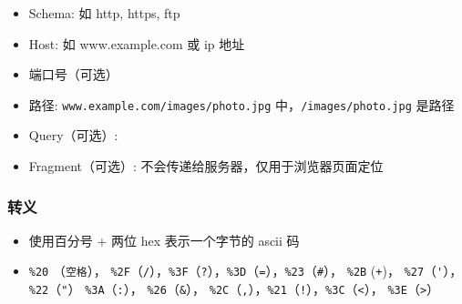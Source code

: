 

\begin{issues}
\issueDraft
\end{issues}

\begin{itemize}
\item Schema: 如 http, https, ftp
\item Host: 如 www.example.com 或 ip 地址
\item 端口号（可选）
\item 路径: \verb`www.example.com/images/photo.jpg` 中，\verb`/images/photo.jpg` 是路径
\item Query（可选）:
\item Fragment（可选）: 不会传递给服务器，仅用于浏览器页面定位
\end{itemize}

\subsubsection{转义}
\begin{itemize}
\item 使用百分号 + 两位 hex 表示一个字节的 ascii 码
\item \verb`%20` （\verb`空格`）， \verb`%2F`（\verb`/`），\verb`%3F`（\verb`?`），\verb`%3D`（\verb`=`），\verb`%23`（\verb`#`）， \verb`%2B` (\verb`+`)， \verb`%27`（\verb`'`），\verb`%22`（\verb`"`） \verb`%3A`（\verb`:`）， \verb`%26`（\verb`&`）， \verb`%2C`（\verb`,`），\verb`%21`（\verb`!`），\verb`%3C`（\verb`<`）， \verb`%3E`（\verb`>`）
\end{itemize}
